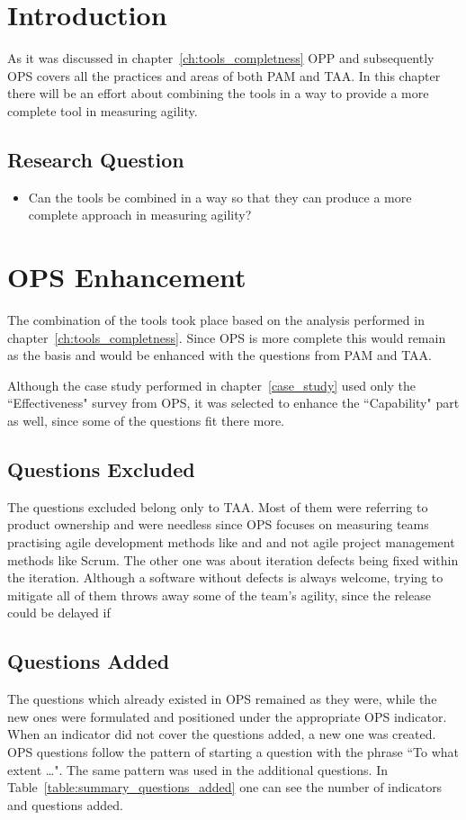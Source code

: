 \section{Introduction}
As it was discussed in chapter~\ref{ch:tools_completness} OPP and subsequently OPS covers all the practices and areas of both PAM and TAA. In this chapter there will be an effort about combining the tools in a way to provide a more complete tool in measuring agility.

\subsection{Research Question}
\begin{itemize}
	\item Can the tools be combined in a way so that they can produce a more complete approach in measuring agility?
\end{itemize}

\section{OPS Enhancement}
The combination of the tools took place based on the analysis performed in chapter~\ref{ch:tools_completness}. Since OPS is more complete this would remain as the basis and would be enhanced with the questions from PAM and TAA.

Although the case study performed in chapter~\ref{case_study} used only the ``Effectiveness" survey from OPS, it was selected to enhance the ``Capability" part as well, since some of the questions fit there more.

\subsection{Questions Excluded}
The questions excluded belong only to TAA. Most of them were referring to product ownership and were needless since OPS focuses on measuring teams practising agile development methods like  and and not agile project management methods like Scrum. The other one was about iteration defects being fixed within the iteration. Although a software without defects is always welcome, trying to mitigate all of them throws away some of the team's agility, since the release could be delayed if 

\subsection{Questions Added}
The questions which already existed in OPS remained as they were, while the new ones were formulated and positioned under the appropriate OPS indicator. When an indicator did not cover the questions added, a new one was created. OPS questions follow the pattern of starting a question with the phrase ``To what extent \dots ". The same pattern was used in the additional questions. In Table~\ref{table:summary_questions_added} one can see the number of indicators and questions added. 

